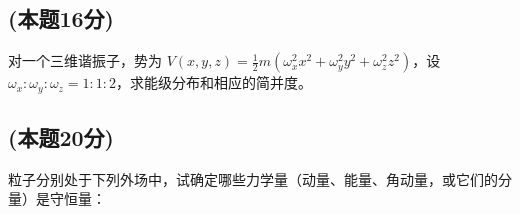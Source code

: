 \subsection{(本题16分)}
对一个三维谐振子，势为 $V(x, y, z) = \frac{1}{2}m \left( \omega_x^2 x^2 + \omega_y^2 y^2 + \omega_z^2 z^2 \right)$，设 $\omega_x : \omega_y : \omega_z = 1 : 1 : 2$，求能级分布和相应的简并度。
\subsection{(本题20分)}
粒子分别处于下列外场中，试确定哪些力学量（动量、能量、角动量，或它们的分量）是守恒量：
\be